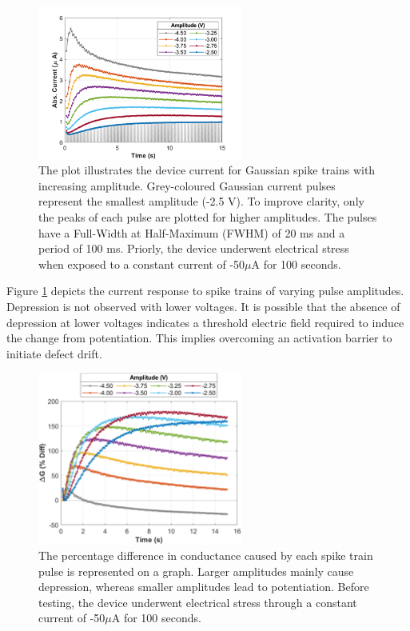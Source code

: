 \begin{figure}[htbp!] 
    \centering    
    \includegraphics[width=0.6\textwidth]{Chapter4/Figs/h.png}
    \caption[Dependence of potentiation and depression on the amplitude of applied voltage pulses.]{The plot illustrates the device current for Gaussian spike trains with increasing amplitude. Grey-coloured Gaussian current pulses represent the smallest amplitude (-2.5 V). To improve clarity, only the peaks of each pulse are plotted for higher amplitudes. The pulses have a Full-Width at Half-Maximum (FWHM) of 20 ms and a period of 100 ms. Priorly, the device underwent electrical stress when exposed to a constant current of -50$\mu$A for 100 seconds.}
    \label{fig:4h}
\end{figure}

\noindent Figure \ref{fig:4h} depicts the current response to spike trains of varying pulse amplitudes. Depression is not observed with lower voltages. It is possible that the absence of depression at lower voltages indicates a threshold electric field required to induce the change from potentiation. This implies overcoming an activation barrier to initiate defect drift.\\


\begin{figure}[htbp!] 
    \centering    
    \includegraphics[width=0.6\textwidth]{Chapter4/Figs/i.png}
    \caption[Depression selection using spike trains of greater amplitudes.]{The percentage difference in conductance caused by each spike train pulse is represented on a graph. Larger amplitudes mainly cause depression, whereas smaller amplitudes lead to potentiation. Before testing, the device underwent electrical stress through a constant current of -50$\mu$A for 100 seconds.}
    \label{fig:4i}
\end{figure}


